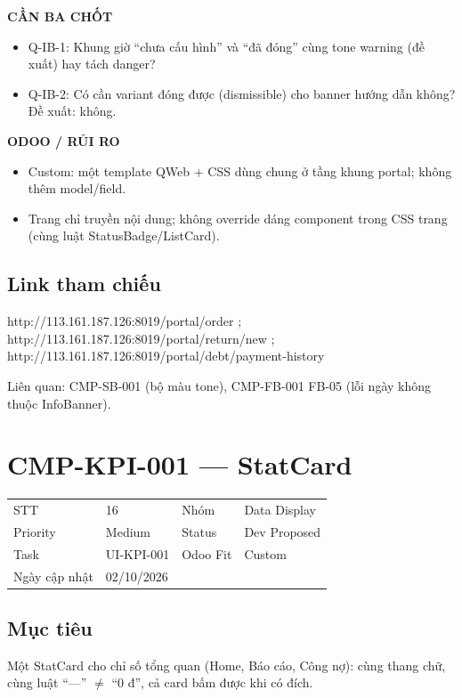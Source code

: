 \documentclass[11pt,a4paper]{report}
\begin{document}
\par\smallskip\textbf{CẦN BA CHỐT}\par
\begin{itemize}
\item Q-IB-1: Khung giờ “chưa cấu hình” và “đã đóng” cùng tone warning (đề xuất) hay tách danger?
\item Q-IB-2: Có cần variant đóng được (dismissible) cho banner hướng dẫn không? Đề xuất: không.
\end{itemize}

\par\smallskip\textbf{ODOO / RỦI RO}\par
\begin{itemize}
\item Custom: một template QWeb + CSS dùng chung ở tầng khung portal; không thêm model/\allowbreak{}field.
\item Trang chỉ truyền nội dung; không override dáng component trong CSS trang (cùng luật StatusBadge/\allowbreak{}ListCard).
\end{itemize}
\subsection*{Link tham chiếu}
http://113.161.187.126:8019/\allowbreak{}portal/\allowbreak{}order ; http://113.161.187.126:8019/\allowbreak{}portal/\allowbreak{}return/\allowbreak{}new ; http://113.161.187.126:8019/\allowbreak{}portal/\allowbreak{}debt/\allowbreak{}payment-\allowbreak{}history\par
Liên quan: CMP-SB-001 (bộ màu tone), CMP-FB-001 FB-05 (lỗi ngày không thuộc InfoBanner).\par
\clearpage
\section{CMP-KPI-001 --- StatCard}
\begin{tabularx}{\textwidth}{@{}l X l X@{}}\toprule
STT & 16 & Nhóm & Data Display\\
Priority & Medium & Status & Dev Proposed\\
Task & UI-KPI-001 & Odoo Fit & Custom\\
Ngày cập nhật & 02/10/2026 & & \\\bottomrule\end{tabularx}
\subsection*{Mục tiêu}
Một StatCard cho chỉ số tổng quan (Home, Báo cáo, Công nợ): cùng thang chữ, cùng luật “—” \(\neq\) “0 đ”, cả card bấm được khi có đích.\par
\end{document}
